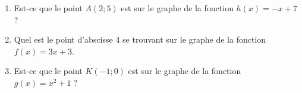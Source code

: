 
\begin{exercice}\label{exosmath-0647}

    \begin{enumerate}
        \item
            Est-ce que le point \( A(2;5)\) est sur le graphe de la fonction \( h(x)=-x+7\) ?
        \item
            Quel est le point d'abscisse \( 4\) se trouvant sur le graphe de la fonction \( f(x)=3x+3\).
        \item
            Est-ce que le point \( K(-1;0)\) est sur le graphe de la fonction \( g(x)=x^2+1\) ?
    \end{enumerate}

\end{exercice}
